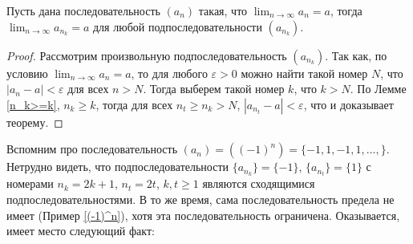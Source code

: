 \begin{theorem}\label{lim(sub)=lim}
    Пусть дана последовательность $(a_n)$ такая, что $\lim_{n\to \infty}a_n = a$, тогда $\lim_{n\to \infty}a_{n_k} =a$ для любой подпоследовательности $(a_{n_k} )$.
\end{theorem}
\begin{proof}
    Рассмотрим произвольную подпоследовательность $(a_{n_k} )$. Так как, по условию $\lim_{n \to \infty}a_n =a$, то для любого $\varepsilon >0$ можно найти такой номер $N$, что $|a_n - a| < \varepsilon$ для всех $n >N$. Тогда выберем такой номер $k$, что $k >N$. По Лемме \ref{n_k>=k}, $n_k \ge k$, тогда для всех $n_t \ge n_k >N$, $|a_{n_t}- a| < \varepsilon$, что и доказывает теорему.
\end{proof}

\begin{example}
 Вспомним про последовательность $(a_n) = ((-1)^n ) = \{-1,1,-1,1, \ldots, \}$. Нетрудно видеть, что подпоследовательности $\{a_{n_k}\} = \{-1\}$, $\{a_{n_t}\} = \{1\}$ с номерами $n_k = 2k+1$, $n_t = 2t$, $k,t \ge 1$ являются сходящимися подпоследовательностями. В то же время, сама последовательность предела не имеет (Пример \ref{(-1)^n}), хотя эта последовательность ограничена. Оказывается, имеет место следующий факт:
\end{example}

